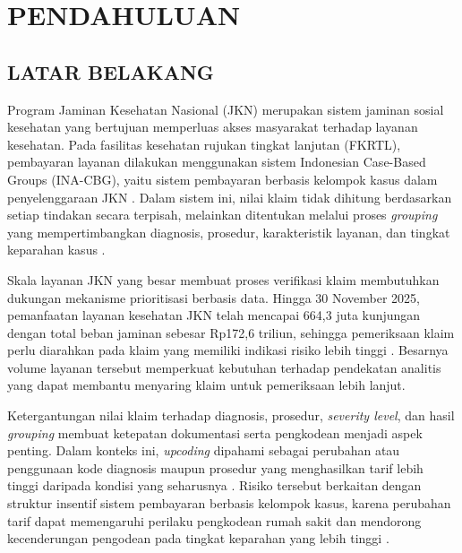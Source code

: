 \chapter{PENDAHULUAN}

\section{LATAR BELAKANG}

Program Jaminan Kesehatan Nasional (JKN) merupakan sistem jaminan sosial kesehatan yang bertujuan memperluas akses masyarakat terhadap layanan kesehatan. Pada fasilitas kesehatan rujukan tingkat lanjutan (FKRTL), pembayaran layanan dilakukan menggunakan sistem Indonesian Case-Based Groups (INA-CBG), yaitu sistem pembayaran berbasis kelompok kasus dalam penyelenggaraan JKN \citep{kemenkes2014,kemenkes2016}. Dalam sistem ini, nilai klaim tidak dihitung berdasarkan setiap tindakan secara terpisah, melainkan ditentukan melalui proses \textit{grouping} yang mempertimbangkan diagnosis, prosedur, karakteristik layanan, dan tingkat keparahan kasus \citep{kemenkes2016}.

Skala layanan JKN yang besar membuat proses verifikasi klaim membutuhkan dukungan mekanisme prioritisasi berbasis data. Hingga 30 November 2025, pemanfaatan layanan kesehatan JKN telah mencapai 664,3 juta kunjungan dengan total beban jaminan sebesar Rp172,6 triliun, sehingga pemeriksaan klaim perlu diarahkan pada klaim yang memiliki indikasi risiko lebih tinggi \citep{djsn2025monthly}. Besarnya volume layanan tersebut memperkuat kebutuhan terhadap pendekatan analitis yang dapat membantu menyaring klaim untuk pemeriksaan lebih lanjut.

Ketergantungan nilai klaim terhadap diagnosis, prosedur, \textit{severity level}, dan hasil \textit{grouping} membuat ketepatan dokumentasi serta pengkodean menjadi aspek penting. Dalam konteks ini, \textit{upcoding} dipahami sebagai perubahan atau penggunaan kode diagnosis maupun prosedur yang menghasilkan tarif lebih tinggi daripada kondisi yang seharusnya \citep{maryana2024}. Risiko tersebut berkaitan dengan struktur insentif sistem pembayaran berbasis kelompok kasus, karena perubahan tarif dapat memengaruhi perilaku pengkodean rumah sakit dan mendorong kecenderungan pengodean pada tingkat keparahan yang lebih tinggi \citep{chalkley2022,crespin2024}.

